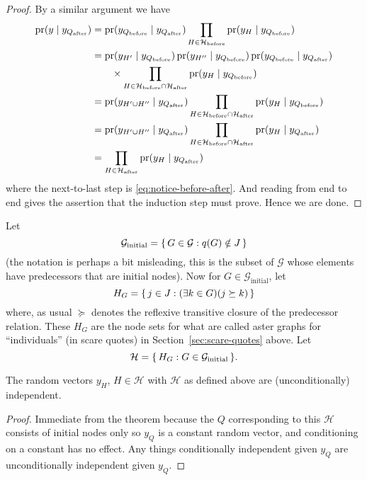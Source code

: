 \begin{proof}
By a similar argument we have
\begin{align*}
   \operatorname{pr}(y \mid  y_{Q_\text{after}})
   & =
   \operatorname{pr}(y_{Q_\text{before}} \mid y_{Q_\text{after}})
   \prod_{H \in \mathcal{H}_\text{before}}
   \operatorname{pr}(y_H \mid y_{Q_\text{before}})
   \\
   & =
   \operatorname{pr}(y_{H'} \mid y_{Q_\text{before}})
   \operatorname{pr}(y_{H''} \mid y_{Q_\text{before}})
   \operatorname{pr}(y_{Q_\text{before}} \mid y_{Q_\text{after}})
   \\
   & \qquad
   \times
   \prod_{H \in \mathcal{H}_\text{before} \cap \mathcal{H}_\text{after}}
   \operatorname{pr}(y_H \mid y_{Q_\text{before}})
   \\
   & =
   \operatorname{pr}(y_{H' \cup H''} \mid  y_{Q_\text{after}})
   \prod_{H \in \mathcal{H}_\text{before} \cap \mathcal{H}_\text{after}}
   \operatorname{pr}(y_H \mid y_{Q_\text{before}})
   \\
   & =
   \operatorname{pr}(y_{H' \cup H''} \mid  y_{Q_\text{after}})
   \prod_{H \in \mathcal{H}_\text{before} \cap \mathcal{H}_\text{after}}
   \operatorname{pr}(y_H \mid y_{Q_\text{after}})
   \\
   & =
   \prod_{H \in \mathcal{H}_\text{after}}
   \operatorname{pr}(y_H \mid y_{Q_\text{after}})
\end{align*}
where the next-to-last step is \eqref{eq:notice-before-after}.
And reading from end to end gives the assertion that the induction step
must prove.  Hence we are done.
\end{proof}

Let
$$
   \mathcal{G}_\text{initial}
   =
   \{\,  G \in \mathcal{G} : q(G) \notin J  \,\}
$$
(the notation is perhaps a bit misleading, this is the subset of $\mathcal{G}$
whose elements have predecessors that are initial nodes).
Now for $G \in \mathcal{G}_\text{initial}$, let
$$
   H_G = \{\,  j \in J : (\exists k \in G)(j \succeq k)  \,\}
$$
where, as usual $\succeq$ denotes the reflexive transitive closure of the
predecessor relation.  These $H_G$ are the node sets for what are called
aster graphs for ``individuals'' (in scare quotes)
in Section~\ref{sec:scare-quotes} above.
Let
$$
   \mathcal{H} = \{\,  H_G : G \in \mathcal{G}_\text{initial}  \,\}.
$$

\begin{corollary}
The random vectors $y_H$, $H \in \mathcal{H}$ with $\mathcal{H}$ as
defined above are (unconditionally) independent.
\end{corollary}
\begin{proof}
Immediate from the theorem because the $Q$ corresponding to this $\mathcal{H}$
consists of initial nodes only so $y_Q$ is a constant random vector, and
conditioning on a constant has no effect.  Any things conditionally independent
given $y_Q$ are unconditionally independent given $y_Q$.
\end{proof}


